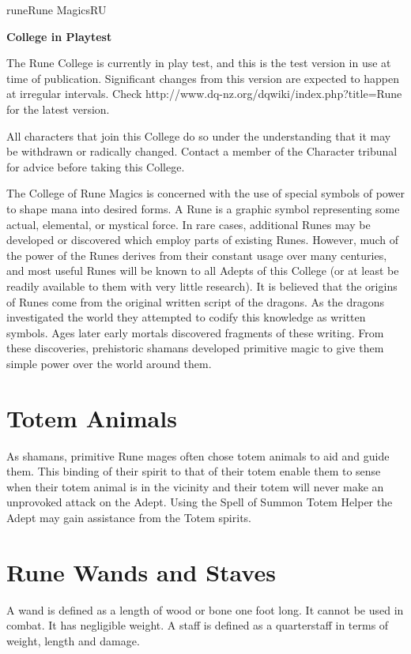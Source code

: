 \begin{College}[2.2]{rune}{Rune Magics}{RU}

\textbf{College in Playtest}

The Rune College is currently in play test, and this is the test
version in use at time of publication.  Significant changes from this
version are expected to happen at irregular intervals. Check
http://www.dq-nz.org/dqwiki/index.php?title=Rune for the latest
version.

All characters that join this College do so under the understanding
that it may be withdrawn or radically changed.  Contact a member of
the Character tribunal for advice before taking this College.

The College of Rune Magics is concerned with the use of special
symbols of power to shape mana into desired forms.  A Rune is a
graphic symbol representing some actual, elemental, or mystical force.
In rare cases, additional Runes may be developed or discovered which
employ parts of existing Runes. However, much of the power of the
Runes derives from their constant usage over many centuries, and most
useful Runes will be known to all Adepts of this College (or at least
be readily available to them with very little research). It is
believed that the origins of Runes come from the original written
script of the dragons. As the dragons investigated the world they
attempted to codify this knowledge as written symbols.  Ages later
early mortals discovered fragments of these writing.  From these
discoveries, prehistoric shamans developed primitive magic to give
them simple power over the world around them.


\section{Totem Animals}

As shamans, primitive Rune mages often chose totem animals to aid and
guide them. This binding of their spirit to that of their totem enable
them to sense when their totem animal is in the vicinity and their
totem will never make an unprovoked attack on the Adept.  Using the
Spell of Summon Totem Helper the Adept may gain assistance from the
Totem spirits.


\section{Rune Wands and Staves}
\label{rune:wands}
A wand is defined as a length of wood or bone one foot long. It cannot
be used in combat. It has negligible weight.  A staff is defined as a
quarterstaff in terms of weight, length and damage.


\end{College}
